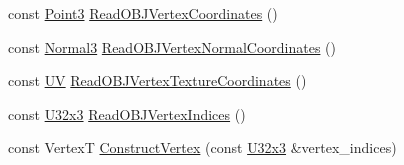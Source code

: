 \begin{DoxyCompactItemize}
const \hyperlink{structmage_1_1_point3}{Point3} \hyperlink{classmage_1_1rendering_1_1loader_1_1_o_b_j_reader_a2c5d954441d64b982d7a89df9171edbc}{Read\+O\+B\+J\+Vertex\+Coordinates} ()
\item 
const \hyperlink{structmage_1_1_normal3}{Normal3} \hyperlink{classmage_1_1rendering_1_1loader_1_1_o_b_j_reader_aa91768722fd418aeba3f12915e8e1525}{Read\+O\+B\+J\+Vertex\+Normal\+Coordinates} ()
\item 
const \hyperlink{structmage_1_1_u_v}{UV} \hyperlink{classmage_1_1rendering_1_1loader_1_1_o_b_j_reader_a3fdbcdecf40525631afc53ce6a6dba45}{Read\+O\+B\+J\+Vertex\+Texture\+Coordinates} ()
\item 
const \hyperlink{namespacemage_ab3633c193f686845fcf80ce95d18a20b}{U32x3} \hyperlink{classmage_1_1rendering_1_1loader_1_1_o_b_j_reader_adf0996ca5d0339782382b46c14768b7f}{Read\+O\+B\+J\+Vertex\+Indices} ()
\item 
const VertexT \hyperlink{classmage_1_1rendering_1_1loader_1_1_o_b_j_reader_aa223ad518d2cdddd1c89a3f113356d77}{Construct\+Vertex} (const \hyperlink{namespacemage_ab3633c193f686845fcf80ce95d18a20b}{U32x3} \&vertex\+\_\+indices)
\end{DoxyCompactItemize}
